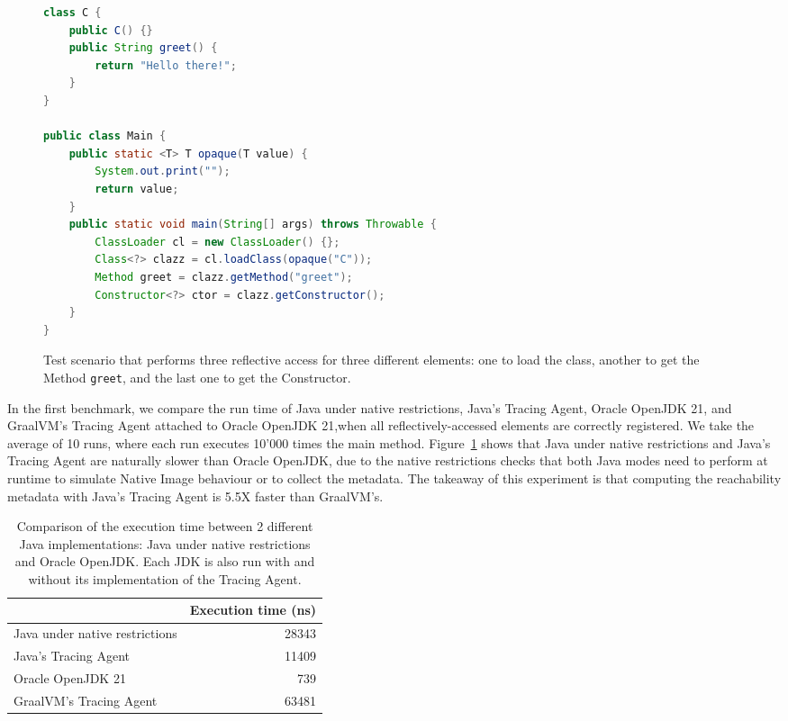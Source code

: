 \begin{figure}[ht]
    \centering
\begin{lstlisting}[language=Java]
class C {
    public C() {}
    public String greet() {
        return "Hello there!";
    }
}

public class Main {
    public static <T> T opaque(T value) {
        System.out.print("");
        return value;
    }
    public static void main(String[] args) throws Throwable {
        ClassLoader cl = new ClassLoader() {};
        Class<?> clazz = cl.loadClass(opaque("C"));
        Method greet = clazz.getMethod("greet");
        Constructor<?> ctor = clazz.getConstructor();
    }
}
\end{lstlisting}
    \caption{Test scenario that performs three reflective access for three different elements: one to load the class, another to get the Method \texttt{greet}, and the last one to get the Constructor.}
    \label{fig:benchmark}
\end{figure}

In the first benchmark, we compare the run time of Java under native restrictions, Java's Tracing Agent, Oracle OpenJDK 21, and GraalVM's Tracing Agent attached to Oracle OpenJDK 21,when all reflectively-accessed elements are correctly registered.
We take the average of 10 runs, where each run executes 10'000 times the main method.
Figure~\ref{tab:benchmark_1} shows that Java under native restrictions and Java's Tracing Agent are naturally slower than Oracle OpenJDK, due to the native restrictions checks that both Java modes need to perform at runtime to simulate Native Image behaviour or to collect the metadata. The takeaway of this experiment is that computing the reachability metadata with Java's Tracing Agent is 5.5X faster than GraalVM's.

\begin{table}[ht]
\centering
\begin{tabular}{@{}lr@{}}
\toprule
                               & \multicolumn{1}{l}{Execution time (ns)} \\ \midrule
Java under native restrictions & 28343                                   \\
Java's Tracing Agent           & 11409                                   \\
Oracle OpenJDK 21              & 739                                     \\ 
GraalVM's Tracing Agent        & 63481                                   \\ \bottomrule
\end{tabular}
\caption{Comparison of the execution time between 2 different Java implementations: Java under native restrictions and Oracle OpenJDK. Each JDK is also run with and without its implementation of the Tracing Agent.}
\label{tab:benchmark_1}
\end{table}

